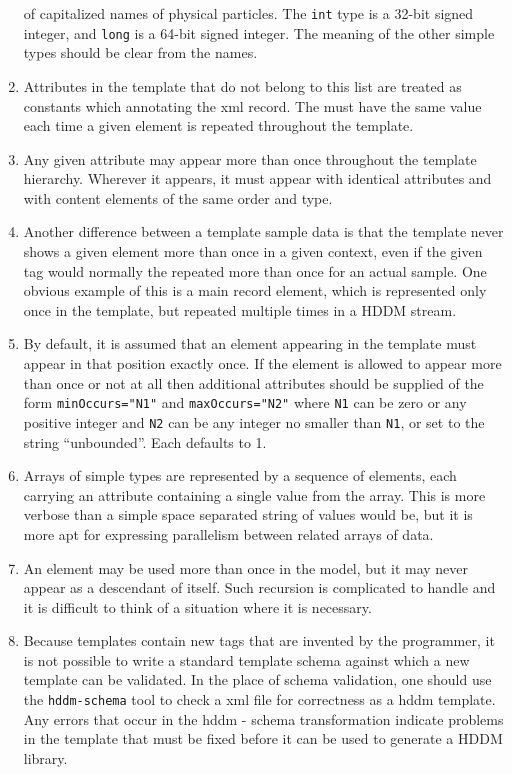 \documentclass{revtex4}
\begin{document}
\begin{enumerate}
of capitalized names of physical particles. The \texttt{int} type is a
32-bit signed integer, and \texttt{long} is a 64-bit signed integer.
The meaning of the other simple types should be clear from the names.
\item  Attributes in the template that do not belong to this list are
treated as constants which annotating the xml record. The must have the
same value each time a given element is repeated throughout the template. 
\item  Any given attribute may appear more than once throughout the template
hierarchy. Wherever it appears, it must appear with identical attributes and
with content elements of the same order and type. 
\item  Another difference between a template sample data is that the
template never shows a given element more than once in a given context,
even if the given tag would normally the repeated more than once for an
actual sample. One obvious example of this is a main record element, which
is represented only once in the template, but repeated multiple times in
a HDDM stream. 
\item  By default, it is assumed that an element appearing in the template
must appear in that position exactly once. If the element is allowed to
appear more than once or not at all then additional attributes should be
supplied of the form \texttt{minOccurs="N1"} and \texttt{maxOccurs="N2"}
where \texttt{N1} can be zero or any positive integer and \texttt{N2}
can be any integer no smaller than \texttt{N1}, or set to the string
``unbounded''. Each defaults to 1. 
\item  Arrays of simple types are represented by a sequence of elements,
each carrying an attribute containing a single value from the array. This
is more verbose than a simple space separated string of values would be,
but it is more apt for expressing parallelism between related arrays of data. 
\item  An element may be used more than once in the model, but it may never
appear as a descendant of itself. Such recursion is complicated to handle
and it is difficult to think of a situation where it is necessary. 
\item  Because templates contain new tags that are invented by the programmer,
it is not possible to write a standard template schema against which a
new template can be validated. In the place of schema validation, one
should use the \texttt{hddm-schema} tool to check a xml file for correctness
as a hddm template. Any errors that occur in the hddm - schema transformation
indicate problems in the template that must be fixed before it can be used
to generate a HDDM library.
\end{enumerate}
\end{document}

